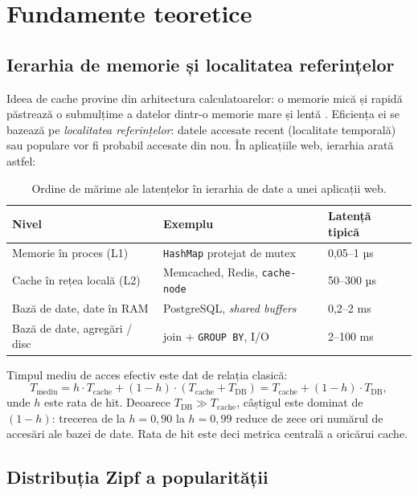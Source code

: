 \chapter{Fundamente teoretice}
\label{ch:fundamente}

\section{Ierarhia de memorie și localitatea referințelor}

Ideea de cache provine din arhitectura calculatoarelor: o memorie mică și rapidă păstrează o
submulțime a datelor dintr-o memorie mare și lentă \cite{hennessy}. Eficiența ei se bazează pe
\emph{localitatea referințelor}: datele accesate recent (localitate temporală) sau populare vor fi
probabil accesate din nou. În aplicațiile web, ierarhia arată astfel:

\begin{table}[H]
\centering\small
\begin{tabular}{lll}
\toprule
Nivel & Exemplu & Latență tipică \\
\midrule
Memorie în proces (L1) & \texttt{HashMap} protejat de mutex & 0{,}05–1 µs \\
Cache în rețea locală (L2) & Memcached, Redis, \texttt{cache-node} & 50–300 µs \\
Bază de date, date în RAM & PostgreSQL, \emph{shared buffers} & 0{,}2–2 ms \\
Bază de date, agregări / disc & join + \texttt{GROUP BY}, I/O & 2–100 ms \\
\bottomrule
\end{tabular}
\caption{Ordine de mărime ale latențelor în ierarhia de date a unei aplicații web.}
\end{table}

Timpul mediu de acces efectiv este dat de relația clasică:
\begin{equation}
  T_{\text{mediu}} = h \cdot T_{\text{cache}} + (1-h)\cdot\left(T_{\text{cache}} + T_{\text{DB}}\right)
  = T_{\text{cache}} + (1-h)\cdot T_{\text{DB}},
  \label{eq:amat}
\end{equation}
unde $h$ este rata de hit. Deoarece $T_{\text{DB}} \gg T_{\text{cache}}$, câștigul este dominat de
$(1-h)$: trecerea de la $h=0{,}90$ la $h=0{,}99$ reduce de zece ori numărul de accesări ale bazei de
date. Rata de hit este deci metrica centrală a oricărui cache.

\section{Distribuția Zipf a popularității}

